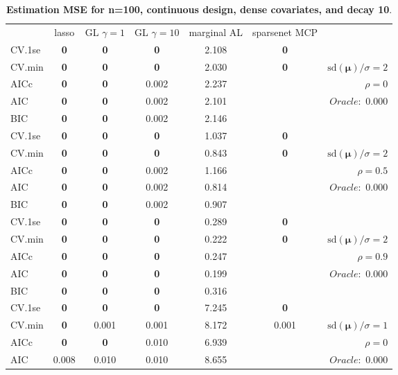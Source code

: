 \clearpage
\begin{table}\vspace{-.5cm}
\caption[l]{ { \bf Estimation MSE for n=100, continuous design, 
dense covariates, and  decay  10}.}
\vspace{-.5cm}
\footnotesize{}
\begin{center}
\begin{tabular}{l*{5}{c}|r}
& lasso & GL $\gamma=1$ & GL $\gamma=10$ & marginal AL & sparsenet MCP  & \\
 \cline{1-7}
CV.1se & {\bf 0} & {\bf 0} & {\bf 0} & 2.108 & {\bf 0} & \\
CV.min & {\bf 0} & {\bf 0} & {\bf 0} & 2.030 & {\bf 0} &  $\mathrm{sd}(\mathbf{\mu})/\sigma=2$ \\
AICc & {\bf 0} & {\bf 0} & 0.002 & 2.237 & & $\rho=0$ \\
AIC & {\bf 0} & {\bf 0} & 0.002 & 2.101 & &  \multirow{2}{*}{$Oracle: $ 0.000} \\
BIC & {\bf 0} & {\bf 0} & 0.002 & 2.146 & &  \\
 \hline 
CV.1se & {\bf 0} & {\bf 0} & {\bf 0} & 1.037 & {\bf 0} & \\
CV.min & {\bf 0} & {\bf 0} & {\bf 0} & 0.843 & {\bf 0} &  $\mathrm{sd}(\mathbf{\mu})/\sigma=2$ \\
AICc & {\bf 0} & {\bf 0} & 0.002 & 1.166 & & $\rho=0.5$ \\
AIC & {\bf 0} & {\bf 0} & 0.002 & 0.814 & &  \multirow{2}{*}{$Oracle: $ 0.000} \\
BIC & {\bf 0} & {\bf 0} & 0.002 & 0.907 & &  \\
 \hline 
CV.1se & {\bf 0} & {\bf 0} & {\bf 0} & 0.289 & {\bf 0} & \\
CV.min & {\bf 0} & {\bf 0} & {\bf 0} & 0.222 & {\bf 0} &  $\mathrm{sd}(\mathbf{\mu})/\sigma=2$ \\
AICc & {\bf 0} & {\bf 0} & {\bf 0} & 0.247 & & $\rho=0.9$ \\
AIC & {\bf 0} & {\bf 0} & {\bf 0} & 0.199 & &  \multirow{2}{*}{$Oracle: $ 0.000} \\
BIC & {\bf 0} & {\bf 0} & {\bf 0} & 0.316 & &  \\
 \hline 
CV.1se & {\bf 0} & {\bf 0} & {\bf 0} & 7.245 & {\bf 0} & \\
CV.min & {\bf 0} & 0.001 & 0.001 & 8.172 & 0.001 &  $\mathrm{sd}(\mathbf{\mu})/\sigma=1$ \\
AICc & {\bf 0} & {\bf 0} & 0.010 & 6.939 & & $\rho=0$ \\
AIC & 0.008 & 0.010 & 0.010 & 8.655 & &  \multirow{2}{*}{$Oracle: $ 0.000} \\

\end{tabular}
\end{center}
\end{table}
